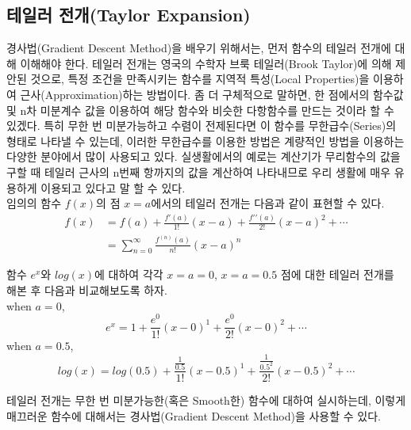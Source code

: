\documentclass[a4paper]{oblivoir}
\begin{document}
\subsection{테일러 전개(Taylor Expansion)}
경사법(Gradient Descent Method)을 배우기 위해서는, 먼저 함수의 테일러 전개에 대해 이해해야 한다. 테일러 전개는 영국의 수학자 브룩 테일러(Brook Taylor)에 의해 제안된 것으로, 특정 조건을 만족시키는 함수를 지역적 특성(Local Properties)을 이용하여 근사(Approximation)하는 방법이다. 좀 더 구체적으로 말하면, 한 점에서의 함수값 및 n차 미분계수 값을 이용하여 해당 함수와 비슷한 다항함수를 만드는 것이라 할 수 있겠다. 특히 무한 번 미분가능하고 수렴이 전제된다면 이 함수를 무한급수(Series)의 형태로 나타낼 수 있는데, 이러한 무한급수를 이용한 방법은 계량적인 방법을 이용하는 다양한 분야에서 많이 사용되고 있다. 실생활에서의 예로는 계산기가 무리함수의 값을 구할 때 테일러 근사의 n번째 항까지의 값을 계산하여 나타내므로 우리 생활에 매우 유용하게 이용되고 있다고 말 할 수 있다. \\
\indent 임의의 함수 $f(x)$의 점 $x=a$에서의 테일러 전개는 다음과 같이 표현할 수 있다.
\begin{align*}
f(x)	&=f(a) + \frac{f\prime(a)}{1!}(x-a) + \frac{f\prime \prime (a)}{2!}(x-a)^{2} + \cdots \tag{4-29}\\
	&=\sum_{n=0}^{\infty}\frac{f^{(n)}(a)}{n!}(x-a)^{n} \tag{4-30}
\end{align*}

\indent 함수 $e^{x}$와 $log(x)$에 대하여 각각 $x=a=0$, $x=a=0.5$ 점에 대한 테일러 전개를 해본 후 다음과 비교해보도록 하자. \\
when $a=0$, 
\begin{equation*}
e^{x} = 1+\frac{e^{0}}{1!}(x-0)^{1}+\frac{e^{0}}{2!}(x-0)^{2}+ \cdots \tag{4-31}
\end{equation*}
when $a=0.5$, 
\begin{equation*}
log(x) = log(0.5) + \frac{\frac{1}{0.5}}{1!}(x-0.5)^{1}+\frac{\frac{1}{0.5^{2}}}{2!}(x-0.5)^{2}+\cdots \tag{4-32}
\end{equation*}

\indent 테일러 전개는 무한 번 미분가능한(혹은 Smooth한) 함수에 대하여 실시하는데, 이렇게 매끄러운 함수에 대해서는 경사법(Gradient Descent Method)을 사용할 수 있다.

\end{document}
